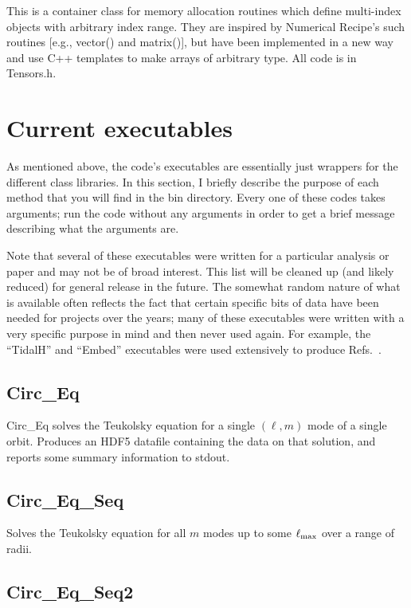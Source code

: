 \documentclass[11pt]{article}
\begin{document}
 This is a container class for memory allocation routines which define multi-index objects with arbitrary index range.  They are inspired by Numerical Recipe's such routines [e.g., vector() and matrix()], but have been implemented in a new way and use C++ templates to make arrays of arbitrary type.  All code is in Tensors.h.
 
\section{Current executables}
 
As mentioned above, the code's executables are essentially just wrappers for the different class libraries.  In this section, I briefly describe the purpose of each method that you will find in the bin directory.  Every one of these codes takes arguments; run the code without any arguments in order to get a brief message describing what the arguments are.

Note that several of these executables were written for a particular analysis or paper and may not be of broad interest.  This list will be cleaned up (and likely reduced) for general release in the future.  The somewhat random nature of what is available often reflects the fact that certain specific bits of data have been needed for projects over the years; many of these executables were written with a very specific purpose in mind and then never used again.  For example, the ``TidalH'' and ``Embed'' executables were used extensively to produce Refs.\ {\cite{embed1,embed2}}.

\subsection{Circ\_Eq}

Circ\_Eq solves the Teukolsky equation for a single $(\ell, m)$ mode of a single orbit.  Produces an HDF5 datafile containing the data on that solution, and reports some summary information to stdout.

\subsection{Circ\_Eq\_Seq}

Solves the Teukolsky equation for all $m$ modes up to some $\ell_{\rm max}$ over a range of radii.

\subsection{Circ\_Eq\_Seq2}
\end{document}
